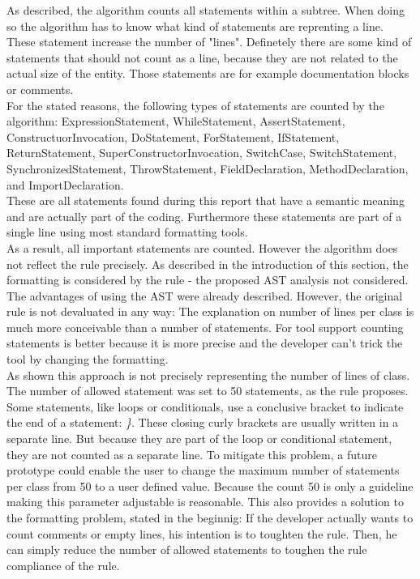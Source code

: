As described, the algorithm counts all statements within a subtree. When doing so the algorithm has to know what kind of statements are reprenting a line. These statement increase the number of "lines". Definetely there are some kind of statements that should not count as a line, because they are not related to the actual size of the entity. Those statements are for example documentation blocks or comments. 
\\

For the stated reasons, the following types of statements are counted by the algorithm: ExpressionStatement, WhileStatement, AssertStatement, ConstructuorInvocation, DoStatement, ForStatement, IfStatement, ReturnStatement, SuperConstructorInvocation, SwitchCase, SwitchStatement, SynchronizedStatement, ThrowStatement, FieldDeclaration, MethodDeclaration, and ImportDeclaration.
\\

These are all statements found during this report that have a semantic meaning and are actually part of the coding. Furthermore these statements are part of a single line using most standard formatting tools.
\\

As a result, all important statements are counted. However the algorithm does not reflect the rule precisely. As described in the introduction of this section, the formatting is considered by the rule - the proposed \ac{AST} analysis not considered. The advantages of using the \ac{AST} were already described. However, the original rule is not devaluated in any way: The explanation on number of lines per class is much more conceivable than a number of statements. For tool support counting statements is better because it is more precise and the developer can't trick the tool by changing the formatting.
\\

As shown this approach is not precisely representing the number of lines of class. The number of allowed statement was set to 50 statements, as the rule proposes. Some statements, like loops or conditionals, use a conclusive bracket to indicate the end of a statement: \textit{\}}. These closing curly brackets are usually written in a separate line. But because they are part of the loop or conditional statement, they are not counted as a separate line. To mitigate this problem, a future prototype could enable the user to change the maximum number of statements per class from 50 to a user defined value. Because the count 50 is only a guideline making this parameter adjustable is reasonable. This also provides a solution to the formatting problem, stated in the beginnig: If the developer actually wants to count comments or empty lines,  his intention is to toughten the rule. Then, he can simply reduce the number of allowed statements to toughen the rule compliance of the rule. 
\\

